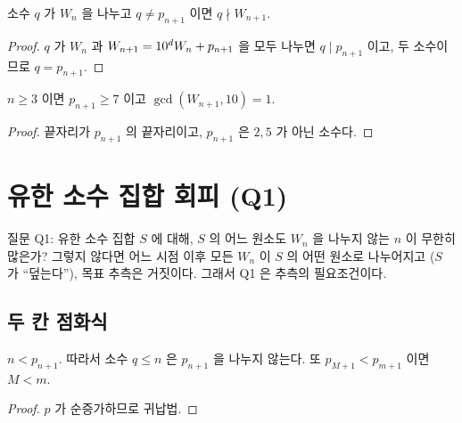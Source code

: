 \begin{lemma}
  \label{lem:not-dvd-succ}
  \leanok
  소수 \(q\) 가 \(W_n\) 을 나누고 \(q \ne p_{n+1}\) 이면 \(q \nmid W_{n+1}\).
\end{lemma}
\begin{proof}
  \leanok
  \(q\) 가 \(W_n\) 과 \(W_{n+1} = 10^{d} W_n + p_{n+1}\) 을 모두 나누면 \(q \mid p_{n+1}\) 이고,
  두 소수이므로 \(q = p_{n+1}\).
\end{proof}

\begin{lemma}[\(2, 5\) 의 자동 배제, C3]
  \label{lem:coprime-ten}
  \leanok
  \(n \ge 3\) 이면 \(p_{n+1} \ge 7\) 이고 \(\gcd(W_{n+1}, 10) = 1\).
\end{lemma}
\begin{proof}
  \leanok
  끝자리가 \(p_{n+1}\) 의 끝자리이고, \(p_{n+1}\) 은 \(2, 5\) 가 아닌 소수다.
\end{proof}

\chapter{유한 소수 집합 회피 (Q1)}

질문 Q1: 유한 소수 집합 \(S\) 에 대해, \(S\) 의 어느 원소도 \(W_n\) 을 나누지 않는 \(n\) 이 무한히 많은가?
그렇지 않다면 어느 시점 이후 모든 \(W_n\) 이 \(S\) 의 어떤 원소로 나누어지고 (\(S\) 가 ``덮는다''),
목표 추측은 거짓이다. 그래서 Q1 은 추측의 필요조건이다.

\section{두 칸 점화식}

\begin{lemma}
  \label{lem:lt-nth-prime}
  \leanok
  \(n < p_{n+1}\). 따라서 소수 \(q \le n\) 은 \(p_{n+1}\) 을 나누지 않는다.
  또 \(p_{M+1} < p_{m+1}\) 이면 \(M < m\).
\end{lemma}
\begin{proof}
  \leanok
  \(p\) 가 순증가하므로 귀납법.
\end{proof}

